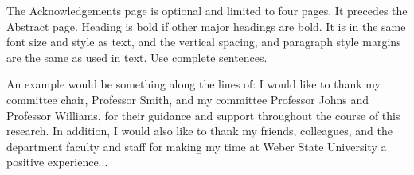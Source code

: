 
The Acknowledgements page is optional and limited to four pages. It precedes the Abstract page. Heading is bold if other major headings are bold. It is in the same font size and style as text, and the vertical spacing, and paragraph style margins are the same as used in text. Use complete sentences.

An example would be something along the lines of:   I would like to thank my committee chair, Professor Smith, and my committee Professor Johns and Professor Williams, for their guidance and support throughout the course of this research.
In addition, I would also like to thank my friends, colleagues, and the department faculty and staff for making my time at Weber State University a positive experience...



